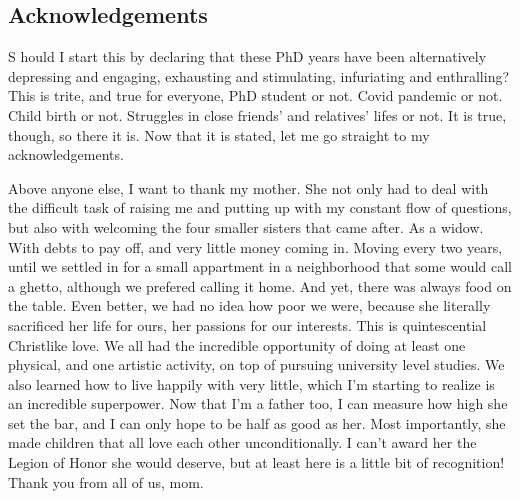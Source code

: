 
{}

\vspace*{-1.6cm}
\begin{flushright}
\section*{\fontsize{20pt}{20pt}\selectfont\textnormal{Acknowledgements}}
\end{flushright}
\vspace{-0.2cm}


\chead[\fancyplain{}{}]
      {\fancyplain{}{}}
\lfoot[\fancyplain{}{}]
      {\fancyplain{}{}}
\cfoot[\fancyplain{}{\thepage}]
      {\fancyplain{}{\thepage}}
\rfoot[\fancyplain{}{}]%
     {\fancyplain{}{\scriptsize}}


\lettrine[lines=1]{S}{ } hould I start this by declaring that these PhD years have been alternatively depressing and engaging, exhausting and stimulating, infuriating and enthralling? This is trite, and true for everyone, PhD student or not. Covid pandemic or not. Child birth or not. Struggles in close friends' and relatives' lifes or not. It is true, though, so there it is. Now that it is stated, let me go straight to my acknowledgements.

Above anyone else, I want to thank my mother. She not only had to deal with the difficult task of raising me and putting up with my constant flow of questions, but also with welcoming the four smaller sisters that came after. As a widow. With debts to pay off, and very little money coming in. Moving every two years, until we settled in for a small appartment in a neighborhood that some would call a ghetto, although we prefered calling it home. And yet, there was always food on the table. Even better, we had no idea how poor we were, because she literally sacrificed her life for ours, her passions for our interests. This is quintescential Christlike love. We all had the incredible opportunity of doing at least one physical, and one artistic activity, on top of pursuing university level studies. We also learned how to live happily with very little, which I'm starting to realize is an incredible superpower. Now that I'm a father too, I can measure how high she set the bar, and I can only hope to be half as good as her. Most importantly, she made children that all love each other unconditionally. I can't award her the Legion of Honor she would deserve, but at least here is a little bit of recognition! Thank you from all of us, mom.

